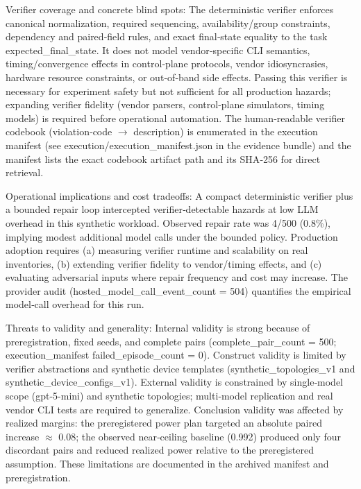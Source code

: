 \documentclass[conference]{IEEEtran}
\begin{document}
Verifier coverage and concrete blind spots: The deterministic verifier enforces canonical normalization, required sequencing, availability/group constraints, dependency and paired‑field rules, and exact final‑state equality to the task expected\_final\_state. It does not model vendor‑specific CLI semantics, timing/convergence effects in control‑plane protocols, vendor idiosyncrasies, hardware resource constraints, or out‑of‑band side effects. Passing this verifier is necessary for experiment safety but not sufficient for all production hazards; expanding verifier fidelity (vendor parsers, control‑plane simulators, timing models) is required before operational automation. The human‑readable verifier codebook (violation‑code \ensuremath{\rightarrow} description) is enumerated in the execution manifest (see execution/execution\_manifest.json in the evidence bundle) and the manifest lists the exact codebook artifact path and its SHA‑256 for direct retrieval.

Operational implications and cost tradeoffs: A compact deterministic verifier plus a bounded repair loop intercepted verifier‑detectable hazards at low LLM overhead in this synthetic workload. Observed repair rate was 4/500 (0.8\%), implying modest additional model calls under the bounded policy. Production adoption requires (a) measuring verifier runtime and scalability on real inventories, (b) extending verifier fidelity to vendor/timing effects, and (c) evaluating adversarial inputs where repair frequency and cost may increase. The provider audit (hosted\_model\_call\_event\_count = 504) quantifies the empirical model‑call overhead for this run.

Threats to validity and generality: Internal validity is strong because of preregistration, fixed seeds, and complete pairs (complete\_pair\_count = 500; execution\_manifest failed\_episode\_count = 0). Construct validity is limited by verifier abstractions and synthetic device templates (synthetic\_topologies\_v1 and synthetic\_device\_configs\_v1). External validity is constrained by single‑model scope (gpt-5-mini) and synthetic topologies; multi‑model replication and real vendor CLI tests are required to generalize. Conclusion validity was affected by realized margins: the preregistered power plan targeted an absolute paired increase \ensuremath{\approx} 0.08; the observed near‑ceiling baseline (0.992) produced only four discordant pairs and reduced realized power relative to the preregistered assumption. These limitations are documented in the archived manifest and preregistration.
\end{document}
